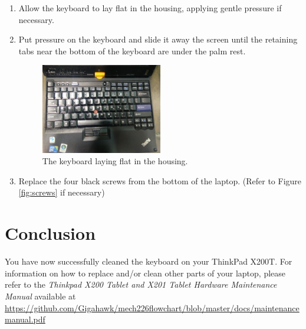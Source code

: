 \documentclass{article}
\begin{document}
\begin{enumerate}
	\item Allow the keyboard to lay flat in the housing, applying gentle pressure if necessary.
	\item Put pressure on the keyboard and slide it away the screen until the retaining tabs near the bottom of the keyboard are under the palm rest.
	\begin{figure}[H]
		\centering
		\includegraphics[width=0.5\textwidth]{keyboardlayflat.jpg}
		\caption{The keyboard laying flat in the housing.}
	\end{figure}

	\item Replace the four black screws from the bottom of the laptop. (Refer to Figure \ref{fig:screws} if necessary)

\end{enumerate}

\section*{Conclusion}
You have now successfully cleaned the keyboard on your ThinkPad X200T.
For information on how to replace and/or clean other parts of your laptop, please refer to the \textit{Thinkpad X200 Tablet and X201 Tablet Hardware Maintenance Manual} available at \url{https://github.com/Gigahawk/mech226flowchart/blob/master/docs/maintenancemanual.pdf}
\end{document}
